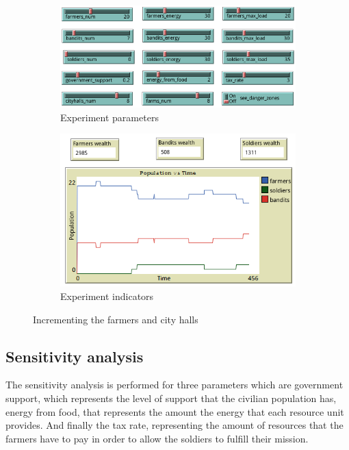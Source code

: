 \documentclass{wscpaperproc}
\begin{document}
\begin{figure}[h!]
    \begin{subfigure}{0.35\textwidth}
    \includegraphics[width=\textwidth]{Images/Exp5_sliders.png}
    \caption{Experiment parameters}
    \end{subfigure}
    \hfill
    \begin{subfigure}{0.35\textwidth}
    \includegraphics[width=\textwidth]{Images/Exp5_indicators.png}
    \caption{Experiment indicators}
    \end{subfigure}%
    \caption{Incrementing the farmers and city halls}
    \label{more_buildings}
\end{figure}

\newpage

\subsection{Sensitivity analysis}

The sensitivity analysis is performed for three parameters which are government
support, which represents the level of support that the civilian population has,
energy from food, that represents the amount the energy that each resource unit
provides. And finally the tax rate, representing the amount of resources that
the farmers have to pay in order to allow the soldiers to fulfill their mission.
\end{document}
